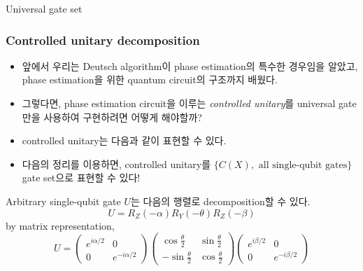 \documentclass[9pt]{beamer}
\begin{document}
\begin{section}{Universal gate set}
        \begin{frame}
            \frametitle{Controlled unitary decomposition}
            \begin{itemize}
                \item 앞에서 우리는 Deutsch algorithm이 phase estimation의 특수한 경우임을 알았고, phase estimation을 위한 quantum circuit의 구조까지 배웠다.
                \item 그렇다면, phase estimation circuit을 이루는 \textit{controlled unitary}를 universal gate만을 사용하여 구현하려면 어떻게 해야할까?
                \item controlled unitary는 다음과 같이 표현할 수 있다.
                \item 다음의 정리를 이용하면, controlled unitary를 $\{C(X), \text{ all single-qubit gates}\}$ gate set으로 표현할 수 있다!
            \end{itemize}
            \vspace{0.2cm}
            \begin{theorem}
                Arbitrary single-qubit gate $U$는 다음의 행렬로 decomposition할 수 있다.
                $$U = R_Z(-\alpha) R_Y(-\theta) R_Z(-\beta)$$
                by matrix representation,
                $$U = \begin{pmatrix} e^{i \alpha/2} & 0 \\ 0 & e^{- i \alpha/2} \end{pmatrix} \begin{pmatrix}  \cos \frac{\theta}{2} & \sin \frac{\theta}{2} \\ -\sin \frac{\theta}{2} & \cos \frac{\theta}{2} \end{pmatrix}  \begin{pmatrix} e^{i \beta/2} & 0 \\ 0 & e^{- i \beta/2}  \end{pmatrix} $$
            \end{theorem}
            
        \end{frame}


\end{section}
\end{document}
